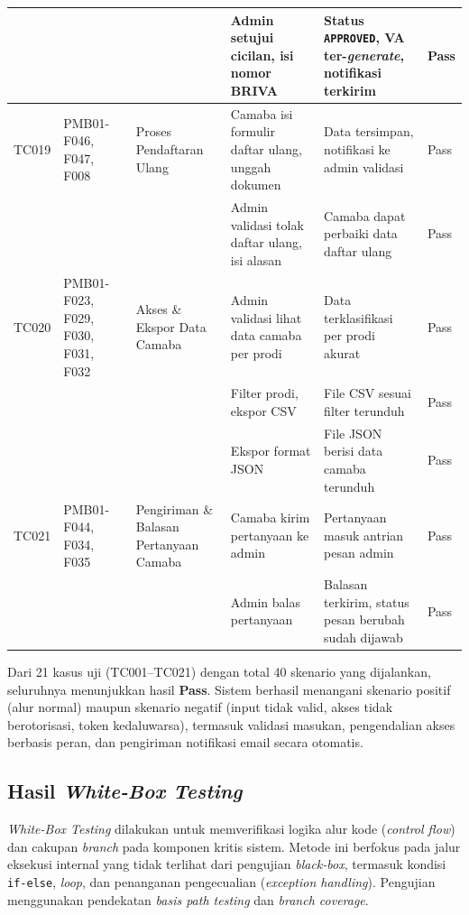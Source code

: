 \begin{longtable}{|T{0.05\textwidth}|T{0.10\textwidth}|T{0.13\textwidth}|T{0.21\textwidth}|T{0.19\textwidth}|T{0.09\textwidth}|}
	\hline
	       &            &                               & Admin setujui cicilan, isi nomor BRIVA & Status \texttt{APPROVED}, VA ter-\textit{generate}, notifikasi terkirim & Pass \\
	\hline
	TC019 & PMB01-F046, F047, F008 & Proses Pendaftaran Ulang & Camaba isi formulir daftar ulang, unggah dokumen & Data tersimpan, notifikasi ke admin validasi & Pass \\
	\hline
	       &            &                               & Admin validasi tolak daftar ulang, isi alasan & Camaba dapat perbaiki data daftar ulang & Pass \\
	\hline
	TC020 & PMB01-F023, F029, F030, F031, F032 & Akses \& Ekspor Data Camaba & Admin validasi lihat data camaba per prodi & Data terklasifikasi per prodi akurat & Pass \\
	\hline
	       &            &                             & Filter prodi, ekspor CSV & File CSV sesuai filter terunduh & Pass \\
	\hline
	       &            &                             & Ekspor format JSON & File JSON berisi data camaba terunduh & Pass \\
	\hline
	TC021 & PMB01-F044, F034, F035 & Pengiriman \& Balasan Pertanyaan Camaba & Camaba kirim pertanyaan ke admin & Pertanyaan masuk antrian pesan admin & Pass \\
	\hline
	       &            &                         & Admin balas pertanyaan & Balasan terkirim, status pesan berubah sudah dijawab & Pass \\
	\hline
\end{longtable}

Dari 21 kasus uji (TC001--TC021) dengan total 40 skenario yang dijalankan, seluruhnya menunjukkan hasil \textbf{Pass}. Sistem berhasil menangani skenario positif (alur normal) maupun skenario negatif (input tidak valid, akses tidak berotorisasi, token kedaluwarsa), termasuk validasi masukan, pengendalian akses berbasis peran, dan pengiriman notifikasi email secara otomatis.\par

\subsection{Hasil \textit{White-Box Testing}} \label{IV.HasilWBT}

\textit{White-Box Testing} dilakukan untuk memverifikasi logika alur kode (\textit{control flow}) dan cakupan \textit{branch} pada komponen kritis sistem. Metode ini berfokus pada jalur eksekusi internal yang tidak terlihat dari pengujian \textit{black-box}, termasuk kondisi \texttt{if-else}, \textit{loop}, dan penanganan pengecualian (\textit{exception handling}). Pengujian menggunakan pendekatan \textit{basis path testing} dan \textit{branch coverage}.\par

